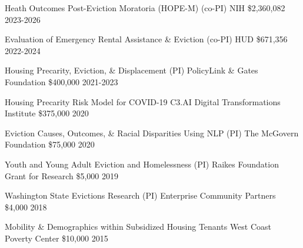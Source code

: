 



\begin{cvhonors}

  \cvhonor
    {Heath Outcomes Post-Eviction Moratoria (HOPE-M) (co-PI)} %
    {NIH} %
    {\$2,360,082} %
    {2023-2026} %
    
  \cvhonor
    {Evaluation of Emergency Rental Assistance \& Eviction (co-PI)} %
    {HUD} %
    {\$671,356} %
    {2022-2024} %

  \cvhonor
    {Housing Precarity, Eviction, \& Displacement (PI)} %
    {PolicyLink \& Gates Foundation} %
    {\$400,000} %
    {2021-2023} %

  \cvhonor
    {Housing Precarity Risk Model for COVID-19} %
    {C3.AI Digital Transformations Institute} %
    {\$375,000} %
    {2020} %

  \cvhonor
    {Eviction Causes, Outcomes, \& Racial Disparities Using NLP (PI)} %
    {The McGovern Foundation} %
    {\$75,000} %
    {2020} %

  \cvhonor
    {Youth and Young Adult Eviction and Homelessness (PI)} %
    {Raikes Foundation Grant for Research} %
    {\$5,000} %
    {2019} %

  \cvhonor
    {Washington State Evictions Research (PI)} %
    {Enterprise Community Partners} %
    {\$4,000} %
    {2018} %

   \cvhonor
    {Mobility \& Demographics within Subsidized Housing Tenants} %
    {West Coast Poverty Center} %
    {\$10,000} %
    {2015} %
\end{cvhonors}


